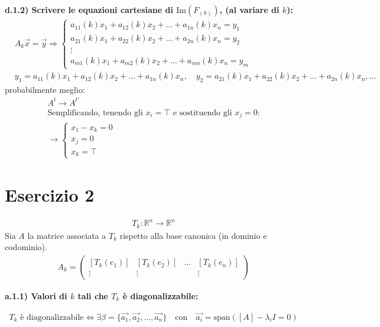 \documentclass[a4paper,12pt]{article}
\begin{document}
\textbf{d.1.2) Scrivere le equazioni cartesiane di $\text{Im}(F_{(k)})$, (al variare di $k$):}
\begin{align*}
    &A_k\vec{x} = \vec{y} \Rightarrow 
    \begin{cases}
        a_{11}(k)x_1 + a_{12}(k)x_2 + \dots + a_{1n}(k)x_n = y_1 \\
        a_{21}(k)x_1 + a_{22}(k)x_2 + \dots + a_{2n}(k)x_n = y_2 \\
        \vdots \\
        a_{m1}(k)x_1 + a_{m2}(k)x_2 + \dots + a_{mn}(k)x_n = y_m
    \end{cases} \\
    &\boxed{y_1 = a_{11}(k)x_1 + a_{12}(k)x_2 + \dots + a_{1n}(k)x_n, \quad y_2 = a_{21}(k)x_1 + a_{22}(k)x_2 + \dots + a_{2n}(k)x_n, \dots}
\end{align*}
probabilmente meglio:
\begin{align}
    A^t \to A^{t'} \\
    \text{Semplificando, tenendo gli $x_i=\top$  e sostituendo gli $x_j=0$:} \\ 
    \to \begin{cases}
        \boxed{x_1-x_k=0} \\
        x_j=0 \\
        x_k=\top
    \end{cases}
\end{align}


\pagebreak
\section*{Esercizio 2}
\begin{align*}
    T_k : \mathbb{R}^n \to \mathbb{R}^n
\end{align*}
Sia \( A \) la matrice associata a \( T_k \) rispetto alla base canonica (in dominio e codominio).
\begin{align*}
    A_k = \begin{pmatrix}
        [T_k(e_1)] & [T_k(e_2)] & \dots & [T_k(e_n)] \\
        \vdots & \vdots & & \vdots
    \end{pmatrix}
\end{align*}

\textbf{a.1.1) Valori di \( k \) tali che \( T_k \) è diagonalizzabile:}

\begin{align*}
    T_k \text{ è diagonalizzabile} \iff \exists \beta = \{ \vec{a_1}, \vec{a_2}, \dots, \vec{a_n} \} \quad \text{con} \quad \vec{a_i} = \text{span}\left( [A] - \lambda_i I = 0 \right)
\end{align*}
\end{document}
